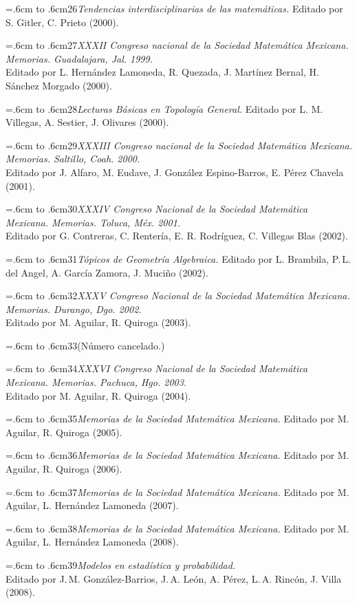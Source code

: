 \documentclass[10pt,pagesize]{scrbook}
\numberwithin{equation}{chapter}
\def\bibl#1{\hangindent=.6cm \noindent \hbox to .6cm{#1\hfill}}
\begin{document}
\bibl{26}{\itshape Tendencias interdisciplinarias de las
matemáticas.}
Editado por S. Gitler, C. Prieto (2000). %

\bibl{27}{\itshape XXXII Congreso nacional de la Sociedad
Matemática Mexicana. Memorias. Guadalajara, Jal. 1999.} \\
Editado por L. Hernández Lamoneda, R. Quezada, J. Martínez
Bernal, H. Sánchez Morgado (2000). %

\bibl{28}{\itshape Lecturas Básicas en Topología General.}
Editado por L. M. Villegas, A. Sestier, J. Olivares
(2000). %

\bibl{29}{\itshape XXXIII Congreso nacional de la Sociedad Matemática
Mexicana. Memorias. Saltillo, Coah. 2000.}\\
Editado por J. Alfaro, M. Eudave, J. González Espino-Barros, E.
Pérez Chavela (2001). %

\bibl{30}{\itshape XXXIV Congreso Nacional de la Sociedad Matemática
Mexicana. Memorias. Toluca, Méx. 2001.}\\
Editado por G. Contreras, C. Rentería, E. R. Rodríguez,
C. Villegas Blas (2002). %

\bibl{31}{\itshape Tópicos de Geometría Algebraica.} 
Editado por L. Brambila, P.\,L. del Angel, A. García Zamora, 
J. Muciño (2002). %

\bibl{32}{\itshape XXXV Congreso Nacional de la Sociedad Matemática
Mexicana. Memorias. Durango, Dgo. 2002.} \\
Editado por M. Aguilar, R. Quiroga (2003). %

\bibl{33}(Número cancelado.)

\bibl{34}{\itshape XXXVI Congreso Nacional de la Sociedad Matemática
Mexicana. Memorias. Pachuca, Hgo. 2003.}\\
Editado por M. Aguilar, R. Quiroga (2004). %

\bibl{35}{\itshape Memorias de la Sociedad Matemática Mexicana.}
Editado por M. Aguilar, R. Quiroga (2005). %

\bibl{36}{\itshape Memorias de la Sociedad Matemática Mexicana.}
Editado por M. Aguilar, R. Quiroga (2006). %

\bibl{37}{\itshape Memorias de la Sociedad Matemática Mexicana.}
Editado por M. Aguilar, L. Hernández Lamoneda (2007). %

\bibl{38}{\itshape Memorias de la Sociedad Matemática Mexicana.}
Editado por M. Aguilar, L. Hernández Lamoneda (2008). %

\bibl{39}{\itshape Modelos en estadística y probabilidad.} \\
Editado por J.\,M. González-Barrios, J.\,A. León, A. Pérez, L.\,A. Rincón, J. Villa (2008). %
\end{document}

